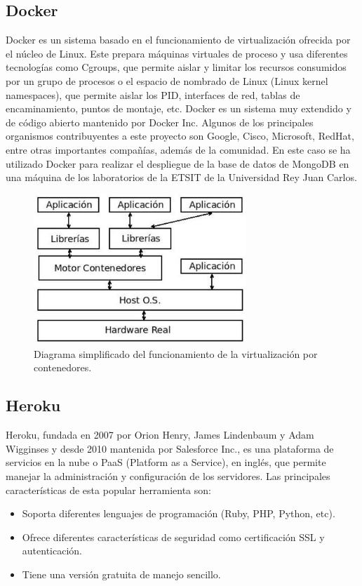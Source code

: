 \documentclass[a4paper, 12pt, oneside]{book}
\begin{document}
\subsection{Docker}
\label{subsec: docker}

Docker es un sistema basado en el funcionamiento de virtualización ofrecida por el núcleo de Linux.
Este prepara máquinas virtuales de proceso y usa diferentes tecnologías como Cgroups, que permite aislar y limitar los recursos consumidos por un grupo de procesos o el espacio de nombrado de Linux (Linux kernel namespaces), que permite aislar los PID, interfaces de red, tablas de encaminamiento, puntos de montaje, etc. Docker es un sistema muy extendido y de código abierto mantenido por Docker Inc. Algunos de los principales organismos contribuyentes a este proyecto son Google, Cisco, Microsoft, RedHat, entre otras importantes compañías, además de la comunidad.
En este caso se ha utilizado Docker para realizar el despliegue de la base de datos de MongoDB en una máquina de los laboratorios de la ETSIT de la Universidad Rey Juan Carlos.

\begin{figure}[H]
	\centering
    \includegraphics[width=8cm, keepaspectratio]{img/docker}
    \caption{Diagrama simplificado del funcionamiento de la virtualización por contenedores.}
    \label{figura:esquema_docker}
\end{figure}

\subsection{Heroku}
\label{subsec: heroku}
Heroku, fundada en 2007 por Orion Henry, James Lindenbaum y Adam Wigginses y desde 2010 mantenida por Salesforce Inc., es una plataforma de servicios en la nube o PaaS (Platform as a Service), en inglés, que permite manejar la administración y configuración de los servidores.
Las principales características de esta popular herramienta son:
\begin{itemize}
	\item Soporta diferentes lenguajes de programación (Ruby, PHP, Python, etc).
	\item Ofrece diferentes características de seguridad como certificación SSL y autenticación.
	\item Tiene una versión gratuita de manejo sencillo.
\end{itemize}
\end{document}
